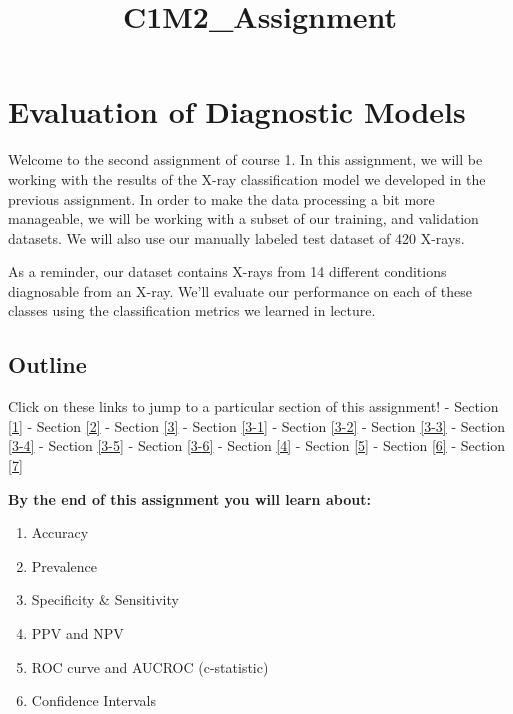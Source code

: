\documentclass[11pt]{article}
\title{C1M2\_Assignment}
\providecommand{\tightlist}{%
      \setlength{\itemsep}{0pt}\setlength{\parskip}{0pt}}
\begin{document}
    
    
    \maketitle
    
    

    
    \hypertarget{evaluation-of-diagnostic-models}{%
\section{Evaluation of Diagnostic
Models}\label{evaluation-of-diagnostic-models}}

Welcome to the second assignment of course 1. In this assignment, we
will be working with the results of the X-ray classification model we
developed in the previous assignment. In order to make the data
processing a bit more manageable, we will be working with a subset of
our training, and validation datasets. We will also use our manually
labeled test dataset of 420 X-rays.

As a reminder, our dataset contains X-rays from 14 different conditions
diagnosable from an X-ray. We'll evaluate our performance on each of
these classes using the classification metrics we learned in lecture.

    \hypertarget{outline}{%
\subsection{Outline}\label{outline}}

Click on these links to jump to a particular section of this assignment!
- Section \ref{1} - Section \ref{2} - Section \ref{3} -
Section \ref{3-1} - Section \ref{3-2} - Section \ref{3-3} -
Section \ref{3-4} - Section \ref{3-5} - Section \ref{3-6} -
Section \ref{4} - Section \ref{5} - Section \ref{6} - Section \ref{7}

    \textbf{By the end of this assignment you will learn about:}

\begin{enumerate}
\def\labelenumi{\arabic{enumi}.}
\tightlist
\item
  Accuracy
\item
  Prevalence
\item
  Specificity \& Sensitivity
\item
  PPV and NPV
\item
  ROC curve and AUCROC (c-statistic)
\item
  Confidence Intervals
\end{enumerate}
\end{document}
